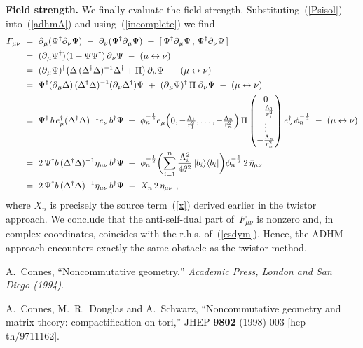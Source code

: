 \documentclass[a4paper,11pt]{article}
\numberwithin{equation}{section}
\def\h{\eta}
\def\th{\theta}
\def\La{\Lambda}
\def\pa{\mbox{$\partial$}}
\def\sfrac#1#2{{\textstyle\frac{#1}{#2}}}
\def\>{\rangle}
\def\<{\langle}
\def\+{\dagger}
\begin{document}
{\noindent
{\bf Field strength.}
We finally evaluate the field strength. Substituting~(\ref{Psisol})
into~(\ref{adhmA}) and using~(\ref{incomplete}) we find 
\begin{align}
F_{\mu\nu}\ &=\
\pa_\mu(\Psi^\+\pa_\nu\Psi)\ -\ \pa_\nu(\Psi^\+\pa_\mu\Psi)\
+\ [\,\Psi^\+\pa_\mu\Psi\,,\,\Psi^\+\pa_\nu\Psi\,] 
\nonumber\\
&=\ (\pa_\mu\Psi^\+) (1-\Psi\Psi^\+)\,\pa_\nu\Psi\ -\ (\mu\leftrightarrow\nu) 
\nonumber\\
&=\ (\pa_\mu\Psi)^\+ 
\bigl( \Delta\,(\Delta^\+\Delta)^{-1}\Delta^\+ + \Pi \bigr)\,\pa_\nu\Psi\ 
-\ (\mu\leftrightarrow\nu) 
\nonumber\\
&=\ \Psi^\+(\pa_\mu\Delta)\,(\Delta^\+\Delta)^{-1} (\pa_\nu\Delta^\+)\Psi\
+\ (\pa_\mu\Psi)^\+\,\Pi\;\pa_\nu\Psi\ -\ (\mu\leftrightarrow\nu) 
\nonumber\\
&=\ \Psi^\+\,b\,e^\+_\mu (\Delta^\+\Delta)^{-1} e_\nu\,b^\+\Psi\ 
+\ \phi_n^{-\frac12} e_\mu
\Bigl(0,-\sfrac{\La_1}{r_1^2},\ldots,-\sfrac{\La_n}{r_n^2}\Bigr)\,\Pi
\begin{pmatrix}
0 \\ -\sfrac{\La_1}{r_1^2} \\ \vdots \\ -\sfrac{\La_n}{r_n^2}
\end{pmatrix}
e^\+_\nu\,\phi_n^{-\frac12}\ -\ (\mu\leftrightarrow\nu) 
\nonumber\\
&=\ 2\,\Psi^\+ b\,(\Delta^\+\Delta)^{-1} \h_{\mu\nu}\,b^\+\Psi\ +\
\phi_n^{-\frac12}\biggl(\sum_{i=1}^n\frac{\La_i^2}{4\th^2}\,|b_i\>\<b_i|\biggr)
\phi_n^{-\frac12}\,2\,\bar\h_{\mu\nu} 
\nonumber\\
&=\ 2\,\Psi^\+ b\,(\Delta^\+\Delta)^{-1} \h_{\mu\nu}\,b^\+\Psi\ 
-\ X_n\,2\,\bar\h_{\mu\nu}\ ,
\end{align}
where $X_n$ is precisely the source term~(\ref{x}) derived earlier in the
twistor approach. We conclude that the anti-self-dual part of~$F_{\mu\nu}$
is nonzero and, in complex coordinates, coincides with the r.h.s. 
of~(\ref{csdym}). Hence, the ADHM approach encounters exactly the same 
obstacle as the twistor method.

\vfill\eject


\begin{thebibliography}{99}

A.~Connes,
``Noncommutative geometry,''
{\it Academic Press, London and San Diego (1994)}.

A.~Connes, M.~R.~Douglas and A.~Schwarz,
``Noncommutative geometry and matrix theory: compactification on tori,''
JHEP {\bf 9802} (1998) 003
[hep-th/9711162].


\end{thebibliography}}
\end{document}
